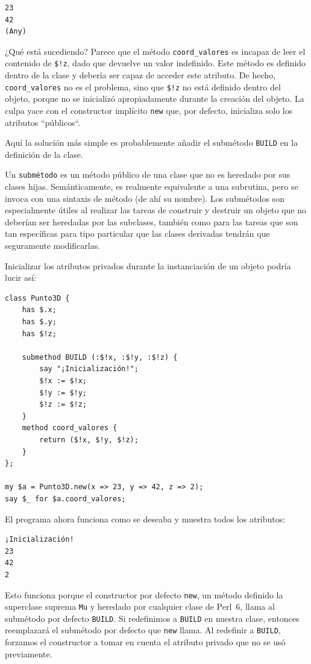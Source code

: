 \begin{verbatim}
23
42
(Any)
\end{verbatim}

¿Qué está sucediendo? Parece que el método \verb|coord_valores|
es incapaz de leer el contenido de \verb|$!z|, dado que 
devuelve un valor indefinido. Este método es definido dentro
de la clase y debería ser capaz de acceder este atributo. De hecho,
\verb|coord_valores| no es el problema, sino que \verb|$!z| no está
definido dentro del objeto, porque no se inicializó apropiadamente
durante la creación del objeto.
La culpa yace con el constructor implícito {\tt new} que, por
defecto, inicializa solo los atributos ``públicos``.

Aquí la solución más simple es probablemente añadir el 
submétodo {\tt BUILD}  en la definición de la clase.

Un {\tt submétodo} es un método público de una clase que 
no es heredado por sus clases hijas. Semánticamente, es realmente
equivalente a una subrutina, pero se invoca con una sintaxis 
de método (de ahí su nombre). Los submétodos son especialmente útiles
al realizar las tareas de construir y destruir un objeto que no 
deberían ser heredadas por las subclases, también como para las
tareas que son tan específicas para tipo particular que las clases
derivadas tendrán que seguramente modificarlas.

Inicializar los atributos privados durante la instanciación de un objeto
podría lucir así:

\begin{verbatim}
class Punto3D {
    has $.x;
    has $.y;
    has $!z;

    submethod BUILD (:$!x, :$!y, :$!z) {
        say "¡Inicialización!";
        $!x := $!x; 
        $!y := $!y; 
        $!z := $!z;
    }
    method coord_valores {
        return ($!x, $!y, $!z);
    }
};

my $a = Punto3D.new(x => 23, y => 42, z => 2);
say $_ for $a.coord_valores;
\end{verbatim}

El programa ahora funciona como se deseaba y muestra 
todos los atributos:

\begin{verbatim}
¡Inicialización!
23
42
2
\end{verbatim}

Esto funciona porque el constructor por defecto {\tt new},
un método definido la superclase suprema {\tt Mu} y heredado
por cualquier clase de Perl~6, llama al submétodo por defecto
{\tt BUILD}. Si redefinimos a {\tt BUILD} en nuestra clase, entonces
reemplazará el submétodo por defecto que {\tt new} llama. Al redefinir
a {\tt BUILD}, forzamos el constructor a tomar en cuenta el
atributo privado que no se usó previamente.

